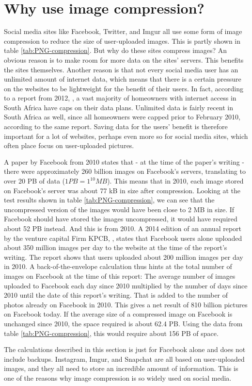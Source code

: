 \section{Why use image compression?}
Social media sites like Facebook, Twitter, and Imgur all use some form of image compression to reduce the size of user-uploaded images.
This is partly shown in table \ref{tab:PNG-compression}.
But why do these sites compress images?
An obvious reason is to make room for more data on the sites' servers.
This benefits the sites themselves.
Another reason is that not every social media user has an unlimited amount of internet data, which means that there is a certain pressure on the websites to be lightweight for the benefit of their users.
In fact, according to a report from 2012, \citep{chetty_2012}, a vast majority of homeowners with internet access in South Africa have caps on their data plans.
Unlimited data is fairly recent in South Africa as well, since all homeowners were capped prior to February 2010, according to the same report.
Saving data for the users' benefit is therefore important for a lot of websites, perhaps even more so for social media sites, which often place focus on user-uploaded pictures.

A paper by Facebook from 2010 \citep{beaver2010} states that - at the time of the paper's writing - there were approximately 260 billion images on Facebook's servers, translating to over 20 PB of data ($1 PB = 1^{10} MB$).
This means that in 2010, each image stored on Facebook's server was about 77 kB in size after compression.
Looking at the test results shown in table \ref{tab:PNG-compression}, we can see that the uncompressed version of the images would have been close to 2 MB in size.
If Facebook should have stored the images uncompressed, it would have required about 52 PB instead.
And this is from 2010.
A 2014 edition of an annual report by the venture capital Firm KPCB, \citep{meeker2014internet}, states that Facebook users alone uploaded about
350 million images per day to the website at the time of the report's writing.
The report shows that users uploaded about 200 million images per day in 2010.
A back-of-the-envelope calculation thus hints at the total number of images on Facebook at the time of this report:
The average number of images uploaded to Facebook each day since 2010 multiplied by the number of days since 2010 until the date of this report's writing.
That is added to the number of photos already on Facebook in 2010.
This gives a net result of 810 billion pictures on Facebook today.
If the average size of a compressed image on Facebook is unchanged since 2010, the space required is about 62.4 PB.
Using the data from table \ref{tab:PNG-compression}, this would require about 156 PB of space.

The calculations described in this section is just for Facebook alone and does not include backups. Instagram, Imgur, 
and Snapchat are all based on user-uploaded images, and they all need to store an incredible amount of information.
This is one of the reasons why image compression is so widely used on social media.
